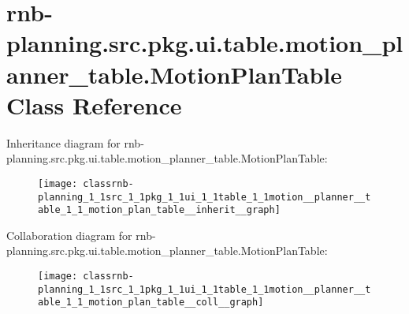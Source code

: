 \hypertarget{classrnb-planning_1_1src_1_1pkg_1_1ui_1_1table_1_1motion__planner__table_1_1_motion_plan_table}{}\section{rnb-\/planning.src.\+pkg.\+ui.\+table.\+motion\+\_\+planner\+\_\+table.\+Motion\+Plan\+Table Class Reference}
\label{classrnb-planning_1_1src_1_1pkg_1_1ui_1_1table_1_1motion__planner__table_1_1_motion_plan_table}


Inheritance diagram for rnb-\/planning.src.\+pkg.\+ui.\+table.\+motion\+\_\+planner\+\_\+table.\+Motion\+Plan\+Table\+:\nopagebreak
\begin{figure}[H]
\begin{center}
\leavevmode
\texttt{[image: classrnb-planning\_1\_1src\_1\_1pkg\_1\_1ui\_1\_1table\_1\_1motion\_\_planner\_\_table\_1\_1\_motion\_plan\_table\_\_inherit\_\_graph]}
\end{center}
\end{figure}


Collaboration diagram for rnb-\/planning.src.\+pkg.\+ui.\+table.\+motion\+\_\+planner\+\_\+table.\+Motion\+Plan\+Table\+:\nopagebreak
\begin{figure}[H]
\begin{center}
\leavevmode
\texttt{[image: classrnb-planning\_1\_1src\_1\_1pkg\_1\_1ui\_1\_1table\_1\_1motion\_\_planner\_\_table\_1\_1\_motion\_plan\_table\_\_coll\_\_graph]}
\end{center}
\end{figure}
